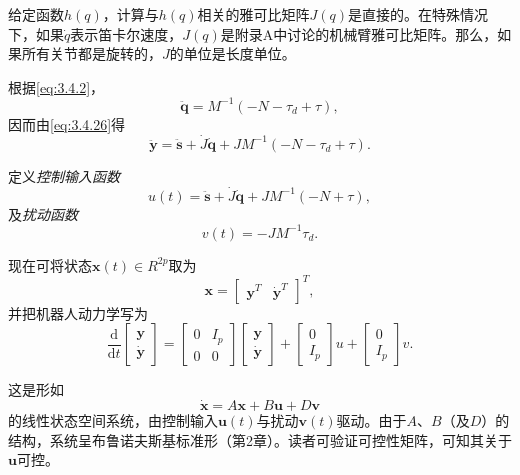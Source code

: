 \documentclass[12pt,a4paper]{ctexart}
\begin{document}
给定函数$h(q)$，计算与$h(q)$相关的雅可比矩阵$J(q)$是直接的。在特殊情况下，如果$\dot{q}$表示笛卡尔速度，$J(q)$是附录A中讨论的机械臂雅可比矩阵。那么，如果所有关节都是旋转的，$J$的单位是长度单位。

根据\eqref{eq:3.4.2}，
\begin{equation}\label{eq:3.4.29}
\ddot{\bm{q}} = M^{-1}(-N - \tau_d + \tau),
\end{equation}
因而由\eqref{eq:3.4.26}得
\begin{equation}\label{eq:3.4.30}
\ddot{\bm{y}} = \ddot{\bm{s}} + \dot{J}\dot{\bm{q}} + JM^{-1}(-N - \tau_d + \tau).
\end{equation}

定义\emph{控制输入函数}
\begin{equation}\label{eq:3.4.31}
u(t) = \ddot{\bm{s}} + \dot{J}\dot{\bm{q}} + JM^{-1}(-N + \tau),
\end{equation}
及\emph{扰动函数}
\begin{equation}\label{eq:3.4.32}
v(t) = -JM^{-1}\tau_d.
\end{equation}

现在可将状态$\bm{x}(t)\in R^{2p}$取为
\begin{equation}\label{eq:3.4.33}
\bm{x} = \begin{bmatrix} \bm{y}^{T} & \dot{\bm{y}}^{T} \end{bmatrix}^{T},
\end{equation}
并把机器人动力学写为
\begin{equation}\label{eq:3.4.34}
\frac{\mathrm{d}}{\mathrm{d}t}\begin{bmatrix} \bm{y} \\ \dot{\bm{y}} \end{bmatrix} = \begin{bmatrix} 0 & I_p \\ 0 & 0 \end{bmatrix}\begin{bmatrix} \bm{y} \\ \dot{\bm{y}} \end{bmatrix} + \begin{bmatrix} 0 \\ I_p \end{bmatrix}u + \begin{bmatrix} 0 \\ I_p \end{bmatrix}v.
\end{equation}

这是形如
\begin{equation}\label{eq:3.4.35}
\dot{\bm{x}} = A\bm{x} + B\bm{u} + D\bm{v}
\end{equation}
的线性状态空间系统，由控制输入$\bm{u}(t)$与扰动$\bm{v}(t)$驱动。由于$A$、$B$（及$D$）的结构，系统呈布鲁诺夫斯基标准形（第2章）。读者可验证可控性矩阵，可知其关于$\bm{u}$可控。
\end{document}
